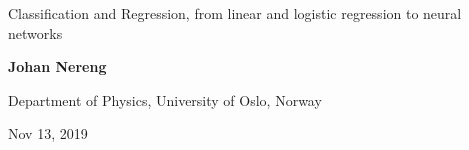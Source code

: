 \documentclass[%
oneside,                 %
final,                   %
10pt]{article}
\begin{document}

\newcommand{\exercisesection}[1]{\subsection*{#1}}






\thispagestyle{empty}

\begin{center}
{\LARGE\bf
\begin{spacing}{1.25}
Classification and Regression, from linear and logistic regression to neural networks
\end{spacing}
}
\end{center}


\begin{center}
{\bf Johan Nereng}
\end{center}

    \begin{center}
\centerline{{\small Department of Physics, University of Oslo, Norway}}
\end{center}
    

\begin{center}
Nov 13, 2019
\end{center}
\end{document}
